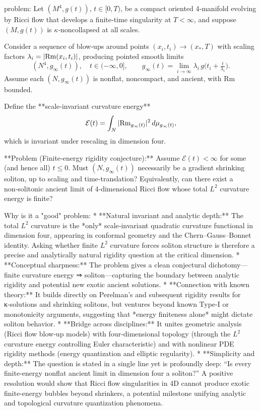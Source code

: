 problem:  
Let $(M^4,g(t))$, $t\in[0,T)$, be a compact oriented 4‑manifold evolving by Ricci flow that develops a finite‑time singularity at $T<\infty$, and suppose $(M,g(t))$ is $\kappa$‑noncollapsed at all scales.  

Consider a sequence of blow‑ups around points $(x_i,t_i)\to(x_\ast,T)$ with scaling factors $\lambda_i = |{\rm Rm}(x_i,t_i)|$, producing pointed smooth limits  
\[
(N^4,g_\infty(t)),\quad t\in(-\infty,0],\qquad g_\infty(t)=\lim_{i\to\infty}\lambda_i\, g\bigl(t_i+\tfrac{t}{\lambda_i}\bigr).
\]
Assume each $(N,g_\infty(t))$ is nonflat, noncompact, and ancient, with $\mathrm{Rm}$ bounded.  

Define the **scale‑invariant curvature energy**
\[
\mathcal{E}(t)=\int_N |{\rm Rm}_{g_\infty(t)}|^2\, d\mu_{g_\infty(t)},
\]
which is invariant under rescaling in dimension four.  

**Problem (Finite‑energy rigidity conjecture):**  
Assume $\mathcal{E}(t)<\infty$ for some (and hence all) $t\le 0$.  
Must $(N,g_\infty(t))$ necessarily be a gradient shrinking soliton, up to scaling and time‑translation?  
Equivalently, can there exist a non‑solitonic ancient limit of 4‑dimensional Ricci flow whose total $L^2$ curvature energy is finite?  

Why is it a "good" problem:  
* **Natural invariant and analytic depth:** The total $L^2$ curvature is the *only* scale‑invariant quadratic curvature functional in dimension four, appearing in conformal geometry and the Chern–Gauss–Bonnet identity.  Asking whether finite $L^2$ curvature forces soliton structure is therefore a precise and analytically natural rigidity question at the critical dimension.  
* **Conceptual sharpness:** The problem gives a clean conjectural dichotomy—finite curvature energy ⇒ soliton—capturing the boundary between analytic rigidity and potential new exotic ancient solutions.  
* **Connection with known theory:** It builds directly on Perelman’s and subsequent rigidity results for κ‑solutions and shrinking solitons, but ventures beyond known Type‑I or monotonicity arguments, suggesting that *energy finiteness alone* might dictate soliton behavior.  
* **Bridge across disciplines:** It unites geometric analysis (Ricci flow blow‑up models) with four‑dimensional topology (through the $L^2$ curvature energy controlling Euler characteristic) and with nonlinear PDE rigidity methods (energy quantization and elliptic regularity).  
* **Simplicity and depth:** The question is stated in a single line yet is profoundly deep: “Is every finite‑energy nonflat ancient limit in dimension four a soliton?”  A positive resolution would show that Ricci flow singularities in 4D cannot produce exotic finite‑energy bubbles beyond shrinkers, a potential milestone unifying analytic and topological curvature quantization phenomena.